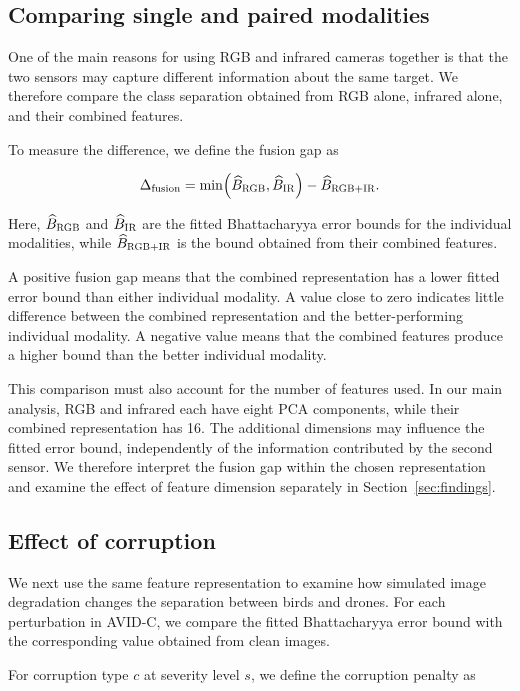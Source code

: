 \documentclass[10pt]{article}
\newcommand{\corrupt}{\textsc{AVID-C}}
\newcommand{\rgb}{\textsc{RGB}}
\newcommand{\ir}{\textsc{IR}}
\newcommand{\Bhat}{\widehat B}
\newcommand{\bfg}{\Delta_{\mathrm{fusion}}}
\begin{document}
\subsection{Comparing single and paired modalities}

One of the main reasons for using RGB and infrared cameras together is that the two sensors may capture different information about the same target. We therefore compare the class separation obtained from RGB alone, infrared alone, and their combined features.

To measure the difference, we define the fusion gap as

\begin{equation}
\bfg
=
\min\!\left(
\Bhat_{\rgb},
\Bhat_{\ir}
\right)
-
\Bhat_{\rgb+\ir}.
\label{eq:bfg}
\end{equation}

Here, $\Bhat_{\rgb}$ and $\Bhat_{\ir}$ are the fitted Bhattacharyya error bounds for the individual modalities, while $\Bhat_{\rgb+\ir}$ is the bound obtained from their combined features.

A positive fusion gap means that the combined representation has a lower fitted error bound than either individual modality. A value close to zero indicates little difference between the combined representation and the better-performing individual modality. A negative value means that the combined features produce a higher bound than the better individual modality.

This comparison must also account for the number of features used. In our main analysis, RGB and infrared each have eight PCA components, while their combined representation has 16. The additional dimensions may influence the fitted error bound, independently of the information contributed by the second sensor. We therefore interpret the fusion gap within the chosen representation and examine the effect of feature dimension separately in Section~\ref{sec:findings}.

\subsection{Effect of corruption}

We next use the same feature representation to examine how simulated image degradation changes the separation between birds and drones. For each perturbation in \corrupt{}, we compare the fitted Bhattacharyya error bound with the corresponding value obtained from clean images.

For corruption type $c$ at severity level $s$, we define the corruption penalty as
\end{document}
